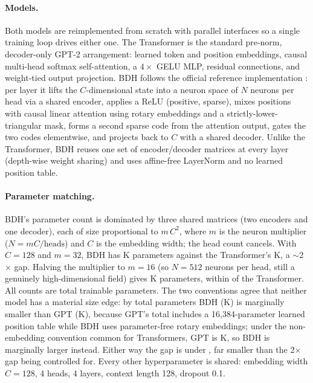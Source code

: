 \documentclass[11pt]{article}
\begin{document}
\paragraph{Models.} Both models are reimplemented from scratch with parallel
interfaces so a single training loop drives either one. The Transformer is the
standard pre-norm, decoder-only GPT-2 arrangement: learned token and position
embeddings, causal multi-head softmax self-attention, a $4\times$ GELU MLP,
residual connections, and weight-tied output projection. BDH follows the
official reference implementation \cite{kosowski2025bdh}: per layer it lifts the
$C$-dimensional state into a neuron space of $N$ neurons per head via a shared
encoder, applies a ReLU (positive, sparse), mixes positions with causal linear
attention using rotary embeddings and a strictly-lower-triangular mask, forms a
second sparse code from the attention output, gates the two codes elementwise,
and projects back to $C$ with a shared decoder. Unlike the Transformer, BDH
reuses one set of encoder/decoder matrices at every layer (depth-wise weight
sharing) and uses affine-free LayerNorm and no learned position table.

\paragraph{Parameter matching.} BDH's parameter count is dominated by three
shared matrices (two encoders and one decoder), each of size proportional to
$m\,C^2$, where $m$ is the neuron multiplier ($N=mC/\text{heads}$) and $C$ is the
embedding width; the head count cancels. With $C=128$ and $m=32$, BDH has
\BdhBigParamsK{}K parameters against the Transformer's \GptParamsK{}K, a
$\sim$2$\times$ gap. Halving the multiplier to $m=16$ (so $N=512$ neurons per
head, still a genuinely high-dimensional field) gives \BdhParamsK{}K
parameters, within \MatchPct{} of the Transformer. All counts are total
trainable parameters. The two conventions agree that neither model has a
material size edge: by total parameters BDH (\BdhParamsK{}K) is marginally
smaller than GPT (\GptParamsK{}K), because GPT's total includes a
16{,}384-parameter learned position table while BDH uses parameter-free rotary
embeddings; under the non-embedding convention common for Transformers, GPT is
\GptParamsNoEmbK{}K, so BDH is marginally larger instead. Either way the gap is
under \MatchPct{}, far smaller than the 2$\times$ gap being controlled for.
Every other hyperparameter is shared: embedding width $C=128$, 4 heads, 4
layers, context length 128, dropout 0.1.
\end{document}
